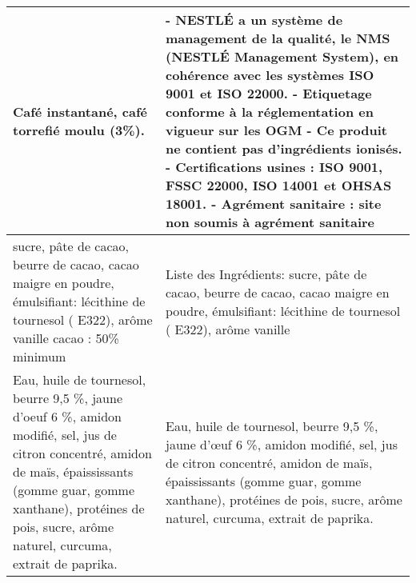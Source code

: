 \begin{longtable}{p{7cm}p{7cm}}
                                                                                                                                                                                                                                                             Café instantané, café torrefié moulu (3\%). &                                                          - NESTLÉ a un système de management de la qualité, le NMS (NESTLÉ  \newline Management System), en cohérence avec les systèmes ISO 9001 et ISO 22000. \newline - Etiquetage conforme à la réglementation en vigueur sur les OGM  \newline - Ce produit ne contient pas d'ingrédients ionisés. \newline - Certifications usines :  ISO 9001, FSSC 22000, ISO 14001 et OHSAS 18001. \newline - Agrément sanitaire : site non soumis à agrément sanitaire \\ \hline
                                                                                                                                                         sucre, pâte de cacao, beurre de cacao, cacao maigre en poudre, émulsifiant: lécithine de tournesol ( E322), arôme vanille \newline cacao : 50\% minimum &                                                                                                                                                                                                                                                                                                                     Liste des Ingrédients: \newline sucre, pâte de cacao, beurre de cacao, cacao maigre en poudre, émulsifiant: lécithine de tournesol ( E322), arôme  \newline vanille \\ \hline
                                                               Eau, huile de tournesol, beurre 9,5 \%, jaune d'oeuf 6 \%, amidon modifié, sel, jus de citron concentré, amidon de maïs, épaississants (gomme guar, gomme xanthane), protéines de pois, sucre, arôme naturel, curcuma, extrait de paprika. &                                                                                                                                                                                                                               Eau, huile de tournesol, beurre 9,5 \%, jaune d'œuf 6 \%, amidon modifié, sel, jus de citron concentré, amidon de maïs, épaississants (gomme guar,  \newline gomme xanthane), protéines de pois, sucre, arôme naturel, curcuma, extrait de paprika. \\ \hline

\end{longtable}
